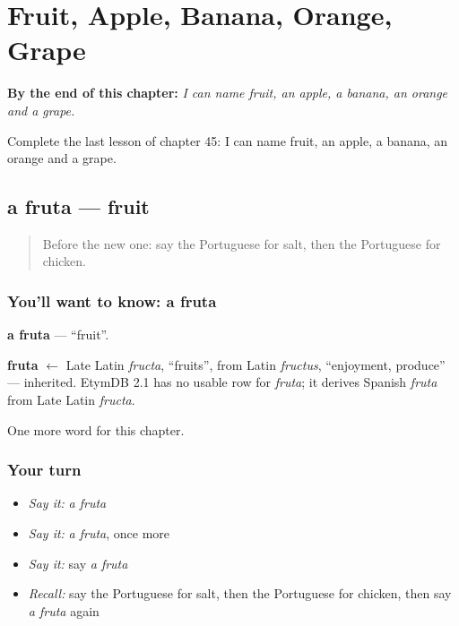 
\chapter{Fruit, Apple, Banana, Orange, Grape}
\label{ch:pt-fruit-apple-banana-orange-grape}

\begin{chapteropening}
\textbf{By the end of this chapter:} \emph{I can name fruit, an apple, a banana, an orange and a grape.}

Complete the last lesson of chapter 45: I can name fruit, an apple, a banana, an orange and a grape.
\end{chapteropening}

\section[a fruta]{a fruta — fruit}

\label{lesson:PT-C45-fruta}



\begin{quote}
Before the new one: say the Portuguese for salt, then the Portuguese for chicken.
\end{quote}

\subsection*{You'll want to know: a fruta}
\textbf{a fruta} — \textquotedblleft{}fruit\textquotedblright{}.

\begin{cousinweb}
\textbf{fruta} $\leftarrow$ Late Latin \emph{fructa}, \textquotedblleft{}fruits\textquotedblright{}, from Latin \emph{fructus}, \textquotedblleft{}enjoyment, produce\textquotedblright{} — inherited. EtymDB 2.1 has no usable row for \emph{fruta}; it derives Spanish \emph{fruta} from Late Latin \emph{fructa}.
\end{cousinweb}

\begin{grammarlens}[title={What you've built}]
One more word for this chapter.
\end{grammarlens}

\subsection*{Your turn}
\begin{itemize}
\raggedright
  \item \emph{Say it:} \emph{a fruta}
  \item \emph{Say it:} \emph{a fruta}, once more
  \item \emph{Say it:} say \emph{a fruta}
  \item \emph{Recall:} say the Portuguese for salt, then the Portuguese for chicken, then say \emph{a fruta} again
\end{itemize}

